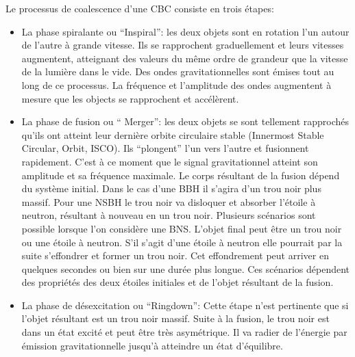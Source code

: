 Le processus de coalescence d'une CBC consiste en trois étapes:
\begin{itemize}

\item La phase spiralante ou ``Inspiral'': les deux objets sont en rotation l'un autour de l'autre à grande vitesse.
  Ils se rapprochent graduellement et leurs vitesses augmentent, atteignant des valeurs du même ordre de grandeur que la vitesse de la lumière dans le vide.
  Des ondes gravitationnelles sont émises tout au long de ce processus.
  La fréquence et l'amplitude des ondes augmentent à mesure que les objects se rapprochent et accélèrent.
  
\item La phase de fusion ou `` Merger'': les deux objets se sont tellement rapprochés qu'ils ont atteint leur dernière orbite circulaire stable (Innermost Stable Circular, Orbit, ISCO).
  Ils ``plongent'' l'un vers l'autre et fusionnent rapidement.
  C'est à ce moment que le signal gravitationnel atteint son amplitude et sa fréquence maximale.
  Le corps résultant de la fusion dépend du système initial.
  Dans le cas d'une BBH il s'agira d'un trou noir plus massif.
  Pour une NSBH le trou noir va disloquer et absorber l'étoile à neutron, résultant à nouveau en un trou noir.
  Plusieurs scénarios sont possible lorsque l'on considère une BNS.
  L'objet final peut être un trou noir ou une étoile à neutron.
  S'il s'agit d'une étoile à neutron elle pourrait par la suite s'effondrer et former un trou noir.
  Cet effondrement peut arriver en quelques secondes ou bien sur une durée plus longue.
  Ces scénarios dépendent des propriétés des deux étoiles initiales et de l'objet résultant de la fusion.
  
\item La phase de désexcitation ou ``Ringdown'': Cette étape n'est pertinente que si l'objet résultant est un trou noir massif.
  Suite à la fusion, le trou noir est dans un état excité et peut être très asymétrique.
  Il va radier de l'énergie par émission gravitationnelle jusqu'à atteindre un état d'équilibre.
\end{itemize}

